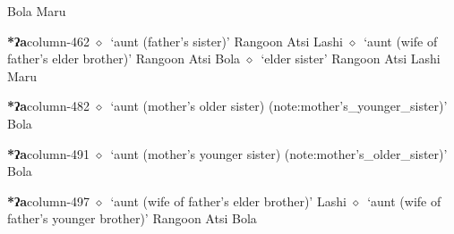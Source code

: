          Bola 
\hspace{1ex}
         Maru 
  \item {\footnotesize \textbf{*ʔa}}{\tiny column-462}
         $\diamond$~`aunt (father's sister)'
         Rangoon 
\hspace{1ex}
         Atsi 
\hspace{1ex}
         Lashi 
\hspace{1ex}
         $\diamond$~`aunt (wife of father's elder brother)'
         Rangoon 
\hspace{1ex}
         Atsi 
\hspace{1ex}
         Bola 
\hspace{1ex}
         $\diamond$~`elder sister'
         Rangoon 
\hspace{1ex}
         Atsi 
\hspace{1ex}
         Lashi 
\hspace{1ex}
         Maru 
  \item {\footnotesize \textbf{*ʔa}}{\tiny column-482}
         $\diamond$~`aunt (mother's older sister) (note:mother's_younger_sister)'
         Bola 
  \item {\footnotesize \textbf{*ʔa}}{\tiny column-491}
         $\diamond$~`aunt (mother's younger sister) (note:mother's_older_sister)'
         Bola 
  \item {\footnotesize \textbf{*ʔa}}{\tiny column-497}
         $\diamond$~`aunt (wife of father's elder brother)'
         Lashi 
\hspace{1ex}
         $\diamond$~`aunt (wife of father's younger brother)'
         Rangoon 
\hspace{1ex}
         Atsi 
\hspace{1ex}
         Bola 
\hspace{1ex}
